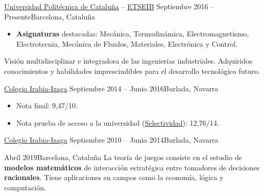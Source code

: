 \documentclass[10pt, a4paper, ragged2e]{altacv}
\begin{document}
{\href{https://upc.edu}{Universidad Politécnica de Cataluña} --
\href{https://etseib.upc.edu}{ETSEIB}}
{Septiembre 2016 -- Presente}{Barcelona, Cataluña}
\begin{itemize}
  \item \textbf{Asignaturas} destacadas: Mecánica, Termodinámica,
  Electromagnetismo, Electrotecnia, Mecánica de Fluidos, Materiales,
  Electrónica y Control.
\end{itemize}
Visión multidisciplinar e integradora de las ingenierías industriales.
Adquiridos conocimientos y habilidades imprescindibles para el desarrollo
tecnológico futuro.

\divider

{\href{https://www.irabia-izaga.org}{Colegio Irabia-Izaga}}
{Septiembre 2014 -- Junio 2016}{Burlada, Navarra}
\begin{itemize}
  \item Nota final: 9,47/10.
  \item Nota prueba de acceso a la universidad
  (\href{https://es.wikipedia.org/wiki/Selectividad_(examen)}{Selectividad}):
  12,76/14.
\end{itemize}

\divider

{\href{https://www.irabia-izaga.org}{Colegio Irabia-Izaga}}
{Septiembre 2010 -- Junio 2014}{Burlada, Navarra}

\medskip
{}

{Abril 2019}{Barcelona, Cataluña}
La teoría de juegos consiste en el estudio de \textbf{modelos matemáticos} de
interacción estratégica entre tomadores de decisiones \textbf{racionales}. Tiene
aplicaciones en campos como la economía, lógica y computación.

\vspace{.1cm}
\divider
\vspace{.15cm}
\end{document}
